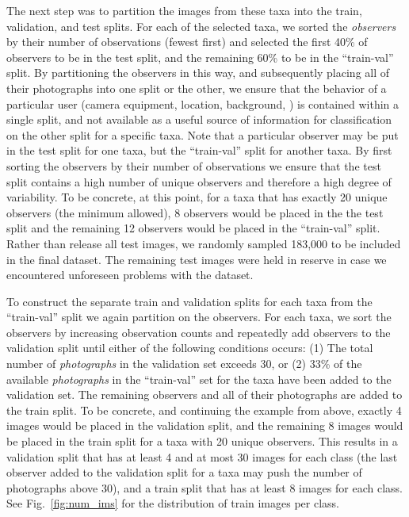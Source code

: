 \documentclass[10pt,twocolumn,letterpaper]{article}
\begin{document}
The next step was to partition the images from these taxa into the train, validation, and test splits. For each of the selected taxa, we sorted the \textit{observers} by their number of observations (fewest first) and selected the first 40\% of observers to be in the test split, and the remaining 60\% to be in the ``train-val'' split. By partitioning the observers in this way, and subsequently placing all of their photographs into one split or the other, we ensure that the behavior of a particular user (\eg camera equipment, location, background, \etc) is contained within a single split, and not available as a useful source of information for classification on the other split for a specific taxa. Note that a particular observer may be put in the test split for one taxa, but the ``train-val'' split for another taxa. By first sorting the observers by their number of observations we ensure that the test split contains a high number of unique observers and therefore a high degree of variability. To be concrete, at this point, for a taxa that has exactly 20 unique observers (the minimum allowed), 8 observers would be placed in the the test split and the remaining 12 observers would be placed in the ``train-val'' split. Rather than release all test images, we randomly sampled 183,000 to be included in the final dataset. The remaining test images were held in reserve in case we encountered unforeseen problems with the dataset.

To construct the separate train and validation splits for each taxa from the ``train-val'' split we again partition on the observers. For each taxa, we sort the observers by increasing observation counts and repeatedly add observers to the validation split until either of the following conditions occurs: (1) The total number of \textit{photographs} in the validation set exceeds 30, or (2) 33\% of the available \textit{photographs} in the ``train-val'' set for the taxa have been added to the validation set. The remaining observers and all of their photographs are added to the train split. To be concrete, and continuing the example from above, exactly 4 images would be placed in the validation split, and the remaining 8 images would be placed in the train split for a taxa with 20 unique observers. This results in a validation split that has at least 4 and at most 30 images for each class (the last observer added to the validation split for a taxa may push the number of photographs above 30), and a train split that has at least 8 images for each class. See Fig.~\ref{fig:num_ims} for the distribution of train images per class.
\end{document}
